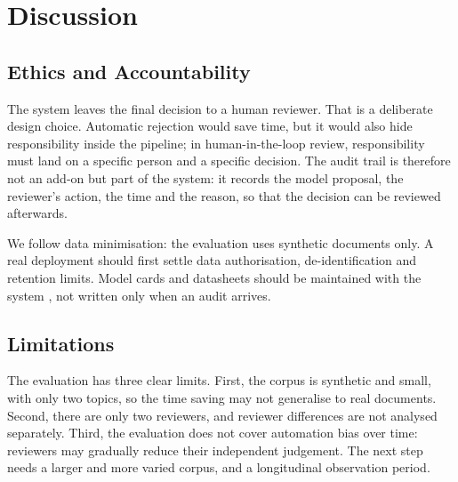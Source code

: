\section{Discussion}
\label{sec:discussion}

\subsection{Ethics and Accountability}
\label{sec:ethics}

The system leaves the final decision to a human reviewer. That is a deliberate design
choice. Automatic rejection would save time, but it would also hide responsibility inside the
pipeline; in human-in-the-loop review, responsibility must land on a specific person and a
specific decision. The audit trail is therefore not an add-on but part of the system: it
records the model proposal, the reviewer's action, the time and the reason, so that the
decision can be reviewed afterwards.

We follow data minimisation: the evaluation uses synthetic documents only. A real deployment
should first settle data authorisation, de-identification and retention limits. Model cards
and datasheets should be maintained with the system \cite{mitchell2019,gebru2021}, not
written only when an audit arrives.

\subsection{Limitations}
\label{sec:limitations}

The evaluation has three clear limits. First, the corpus is synthetic and small, with only
two topics, so the time saving may not generalise to real documents. Second, there are only
two reviewers, and reviewer differences are not analysed separately. Third, the evaluation
does not cover automation bias over time: reviewers may gradually reduce their independent
judgement. The next step needs a larger and more varied corpus, and a longitudinal
observation period.
